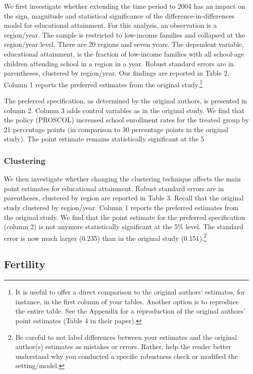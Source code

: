 \documentclass[12pt,a4paper]{article}
\begin{document}
\begin{spacing}{1.5}
We first investigate whether extending the time period to 2004 has an impact on the sign, magnitude and statistical significance of the difference-in-differences model for educational attainment. For this analysis, an observation is a region/year. The sample is restricted to low-income families and collapsed at the region/year level. There are 20 regions and seven years. The dependent variable, educational attainment, is the fraction of low-income families with all school-age children attending school in a region in a year. Robust standard errors are in parentheses, clustered by region/year. Our findings are reported in Table 2. Column 1 reports the preferred estimates from the original study.\footnote{It is useful to offer a direct comparison to the original authors‘ estimates, for instance, in the first column of your tables. Another option is to reproduce the entire table. See the Appendix for a reproduction of the original authors’ point estimates (Table 4 in their paper).}

The preferred specification, as determined by the original authors, is presented in column 2. Column 3 adds control variables as in the original study. We find that the policy (PROSCOL) increased school enrollment rates for the treated group by 21 percentage points (in comparison to 30 percentage points in the original study). The point estimate remains statistically significant at the 5%

\subsubsection{Clustering}

We then investigate whether changing the clustering technique affects the main point estimates for educational attainment. Robust standard errors are in parentheses, clustered by region are reported in Table 3. Recall that the original study clustered by region/year. Column 1 reports the preferred estimates from the original study. We find that the point estimate for the preferred specification (column 2) is not anymore statistically significant at the 5\% level. The standard error is now much larger (0.235) than in the original study (0.151).\footnote{Be careful to not label differences between your estimates and the original author(s) estimates as mistakes or errors. Rather, help the reader better understand why you conducted a specific robustness check or modified the setting/model.}

\subsection{Fertility}


\end{spacing}
\end{document}
